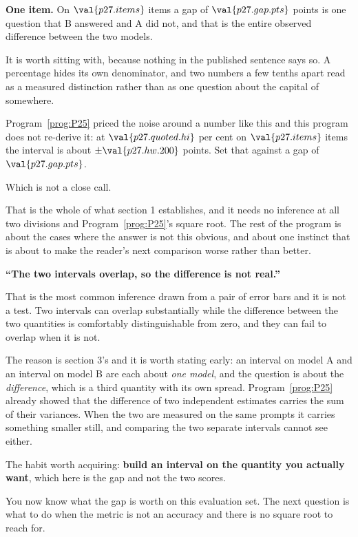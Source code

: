 \begin{fr}

\textbf{One item.} On $\val{p27.items}$ items a gap of $\val{p27.gap.pts}$
points is one question that B answered and A did not, and that is the entire
observed difference between the two models.

It is worth sitting with, because nothing in the published sentence says so.
A percentage hides its own denominator, and two numbers a few tenths apart
read as a measured distinction rather than as one question about the capital
of somewhere.

Program~\ref{prog:P25} priced the noise around a number like this and this
program does not re-derive it: at $\val{p27.quoted.hi}$ per cent on
$\val{p27.items}$ items the interval is about $\pm\val{p27.hw.200}$ points.
Set that against a gap of $\val{p27.gap.pts}$.
\dotline
\nextframe
\end{fr}

\begin{fr}

Which is not a close call.


That is the whole of what section 1 establishes, and it needs no inference at
all \dash{} two divisions and Program~\ref{prog:P25}'s square root. The rest
of the program is about the cases where the answer is not this obvious, and
about one instinct that is about to make the reader's next comparison worse
rather than better.
\end{fr}

\begin{fr}
\begin{trapbox}
\textbf{\enquote{The two intervals overlap, so the difference is not real.}}

That is the most common inference drawn from a pair of error bars and it is
not a test. Two intervals can overlap substantially while the difference
between the two quantities is comfortably distinguishable from zero, and
they can fail to overlap when it is not.

The reason is section 3's and it is worth stating early: an interval on
model A and an interval on model B are each about \emph{one model}, and the
question is about the \emph{difference}, which is a third quantity with its
own spread. Program~\ref{prog:P25} already showed that the difference of two
independent estimates carries the sum of their variances. When the two are
measured on the same prompts it carries something smaller still, and
comparing the two separate intervals cannot see either.

The habit worth acquiring: \textbf{build an interval on the quantity you
actually want}, which here is the gap and not the two scores.
\end{trapbox}

You now know what the gap is worth on this evaluation set. The next question
is what to do when the metric is not an accuracy and there is no square root
to reach for.
\end{fr}

